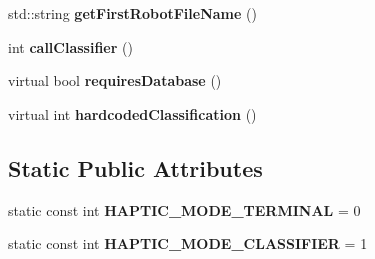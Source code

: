 \begin{DoxyCompactItemize}
\item 
std\+::string {\bfseries get\+First\+Robot\+File\+Name} ()\hypertarget{classkukadu_1_1SensingController_a9d11ad0c9456cb4a619fea2fa4b2f8ee}{}\label{classkukadu_1_1SensingController_a9d11ad0c9456cb4a619fea2fa4b2f8ee}

\item 
int {\bfseries call\+Classifier} ()\hypertarget{classkukadu_1_1SensingController_ab41923ec33e5fa45d114b20b3ac7775d}{}\label{classkukadu_1_1SensingController_ab41923ec33e5fa45d114b20b3ac7775d}

\item 
virtual bool {\bfseries requires\+Database} ()\hypertarget{classkukadu_1_1SensingController_ac56bd8951624f28961e69af2728f501a}{}\label{classkukadu_1_1SensingController_ac56bd8951624f28961e69af2728f501a}

\item 
virtual int {\bfseries hardcoded\+Classification} ()\hypertarget{classkukadu_1_1SensingController_a03eb70278986941270316a4eb59bffa6}{}\label{classkukadu_1_1SensingController_a03eb70278986941270316a4eb59bffa6}

\end{DoxyCompactItemize}
\subsection*{Static Public Attributes}
\begin{DoxyCompactItemize}
\item 
static const int {\bfseries H\+A\+P\+T\+I\+C\+\_\+\+M\+O\+D\+E\+\_\+\+T\+E\+R\+M\+I\+N\+AL} = 0\hypertarget{classkukadu_1_1SensingController_acad6c7b0b6090e0cfe9e00bbfbb50703}{}\label{classkukadu_1_1SensingController_acad6c7b0b6090e0cfe9e00bbfbb50703}

\item 
static const int {\bfseries H\+A\+P\+T\+I\+C\+\_\+\+M\+O\+D\+E\+\_\+\+C\+L\+A\+S\+S\+I\+F\+I\+ER} = 1\hypertarget{classkukadu_1_1SensingController_a147d51f3bbf9f4db6ba670a294075fef}{}\label{classkukadu_1_1SensingController_a147d51f3bbf9f4db6ba670a294075fef}

\end{DoxyCompactItemize}
